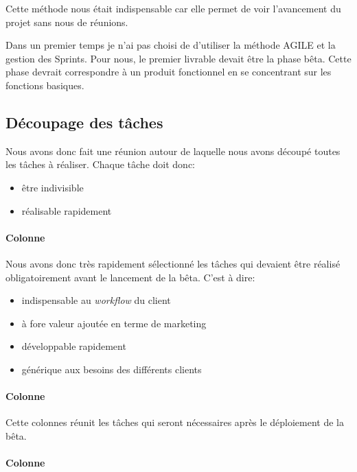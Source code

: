 \documentclass[]{report}
\begin{document}
    Cette méthode nous était indispensable car elle permet de voir l'avancement du projet sans nous  de réunions.

    Dans un premier temps je n'ai pas choisi de d'utiliser la méthode AGILE et la gestion des Sprints. Pour nous, le premier livrable devait être la phase bêta. Cette phase devrait correspondre à un produit fonctionnel en se concentrant sur les fonctions basiques.

    \subsection{Découpage des tâches}

      Nous avons donc fait une réunion autour de laquelle nous avons découpé toutes les tâches à réaliser. Chaque tâche doit donc:

      \begin{itemize}
        \item être indivisible
        \item réalisable rapidement
      \end{itemize}

      \paragraph{Colonne }

        Nous avons donc très rapidement sélectionné les tâches qui devaient être réalisé obligatoirement avant le lancement de la bêta. C'est à dire:

        \begin{itemize}
          \item indispensable au \textit{workflow} du client
          \item à fore valeur ajoutée en terme de marketing
          \item développable rapidement
          \item générique aux besoins des différents clients
        \end{itemize}

      \paragraph{Colonne }

        Cette colonnes réunit les tâches qui seront nécessaires après le déploiement de la bêta.

      \paragraph{Colonne }
\end{document}

